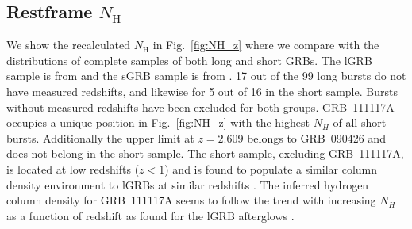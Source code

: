 \documentclass{aa}    %
\begin{document}
\subsection{Restframe $N_\mathrm{H}$} \label{restnH}

We show the recalculated $N_\mathrm{H}$ in Fig.~\ref{fig:NH_z} where we compare
with the distributions of complete samples of both long and short GRBs. The lGRB
sample is from \citet{Arcodia2016} and the sGRB sample is from
\citet{DAvanzo2014a}. 17 out of the 99 long bursts do not have measured redshifts, and
likewise for 5 out of 16 in the short sample. Bursts without measured redshifts have been
excluded for both groups. GRB~111117A occupies a unique position in
Fig.~\ref{fig:NH_z} with the highest $N_H$ of all short bursts. Additionally the
upper limit at $z = 2.609$ belongs to GRB~090426 and does not belong in the
short sample. The short sample, excluding GRB~111117A, is located at low
redshifts ($z < 1$) and is found to populate a similar column density
environment to lGRBs at similar redshifts \citep{DAvanzo2014a}. The inferred
hydrogen column density for GRB~111117A seems to follow the trend with increasing $N_H$
as a function of redshift as found for the lGRB afterglows \citep{Arcodia2016}. 

\end{document}
